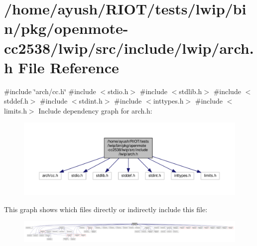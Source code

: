 \hypertarget{openmote-cc2538_2lwip_2src_2include_2lwip_2arch_8h}{}\section{/home/ayush/\+R\+I\+O\+T/tests/lwip/bin/pkg/openmote-\/cc2538/lwip/src/include/lwip/arch.h File Reference}
\label{openmote-cc2538_2lwip_2src_2include_2lwip_2arch_8h}
{\ttfamily \#include \char`\"{}arch/cc.\+h\char`\"{}}\newline
{\ttfamily \#include $<$stdio.\+h$>$}\newline
{\ttfamily \#include $<$stdlib.\+h$>$}\newline
{\ttfamily \#include $<$stddef.\+h$>$}\newline
{\ttfamily \#include $<$stdint.\+h$>$}\newline
{\ttfamily \#include $<$inttypes.\+h$>$}\newline
{\ttfamily \#include $<$limits.\+h$>$}\newline
Include dependency graph for arch.\+h\+:
\nopagebreak
\begin{figure}[H]
\begin{center}
\leavevmode
\includegraphics[width=350pt]{openmote-cc2538_2lwip_2src_2include_2lwip_2arch_8h__incl}
\end{center}
\end{figure}
This graph shows which files directly or indirectly include this file\+:
\nopagebreak
\begin{figure}[H]
\begin{center}
\leavevmode
\includegraphics[width=350pt]{openmote-cc2538_2lwip_2src_2include_2lwip_2arch_8h__dep__incl}
\end{center}
\end{figure}
